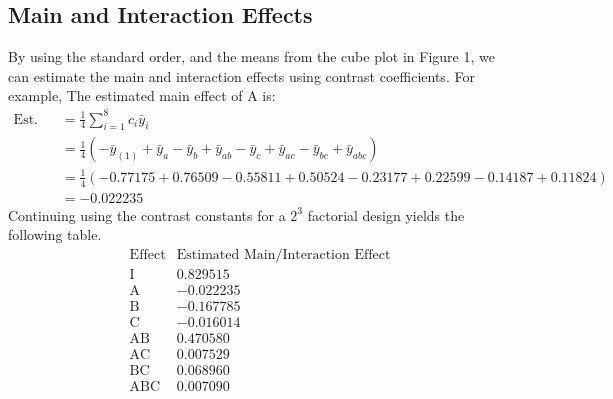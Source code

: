 \documentclass{article}
\begin{document}
\subsection{Main and Interaction Effects}
  By using the standard order, and the means from the cube plot in Figure 1, we can estimate the main and interaction effects using contrast coefficients.
  For example, The estimated main effect of A is:
  \begin{align*}
    \text{Est. Main Effect of A} &= \frac{1}{4} \sum_{i=1}^{8} c_i \bar{y}_i \\
                                &= \frac{1}{4} \left( -\bar{y}_{(1)} + \bar{y}_{a} - \bar{y}_{b} + \bar{y}_{ab} - \bar{y}_{c} + \bar{y}_{ac} - \bar{y}_{bc} + \bar{y}_{abc}\right) \\
                                &= \frac{1}{4} \left( -0.77175 + 0.76509 - 0.55811 + 0.50524 - 0.23177 + 0.22599 - 0.14187 + 0.11824\right) \\ 
                                &= -0.022235
  \end{align*}
  Continuing using the contrast constants for a $2^3$ factorial design yields the following table.
  \begin{equation*}
    \begin{array}{c|c}
        \text{Effect} & \text{Estimated Main/Interaction Effect} \\
        \hline
        \text{I}   & 0.829515 \\
        \text{A}   & -0.022235 \\
        \text{B}   & -0.167785 \\
        \text{C}   & -0.016014 \\
        \text{AB}  & 0.470580 \\
        \text{AC}  & 0.007529 \\
        \text{BC}  & 0.068960 \\
        \text{ABC} & 0.007090 \\
    
    \end{array}
    \end{equation*}\\
\clearpage
\end{document}
